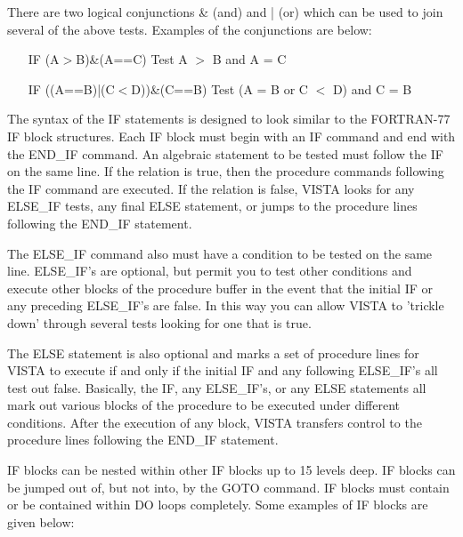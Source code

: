 There are two logical conjunctions \& (and) and | (or) which can be used to
join several of the above tests. Examples of the conjunctions are below:
\begin{itemize}
  \item[IF (A$>$B)\&(A==C)\hfill]{Test A $>$ B and A = C}
  \item[IF ((A==B)|(C$<$D))\&(C==B)\hfill]{Test (A = B or C $<$ D) and C = B}
\end{itemize}

The syntax of the IF statements is designed to look similar to the
FORTRAN-77 IF block structures.  Each IF block must begin with an IF
command and end with the END\_IF command.  An algebraic statement to be
tested must follow the IF on the same line.  If the relation is true, then
the procedure commands following the IF command are executed. If the
relation is false, VISTA looks for any ELSE\_IF tests, any final ELSE
statement, or jumps to the procedure lines following the END\_IF statement.

The ELSE\_IF command also must have a condition to be tested on the same
line.  ELSE\_IF's are optional, but permit you to test other conditions and
execute other blocks of the procedure buffer in the event that the initial
IF or any preceding ELSE\_IF's are false.  In this way you can allow VISTA
to 'trickle down' through several tests looking for one that is true.

The ELSE statement is also optional and marks a set of procedure lines for
VISTA to execute if and only if the initial IF and any following ELSE\_IF's
all test out false. Basically, the IF, any ELSE\_IF's, or any ELSE
statements all mark out various blocks of the procedure to be executed
under different conditions.  After the execution of any block, VISTA
transfers control to the procedure lines following the END\_IF statement.

IF blocks can be nested within other IF blocks up to 15 levels deep.  IF
blocks can be jumped out of, but not into, by the GOTO command. IF blocks
must contain or be contained within DO loops completely. Some examples of
IF blocks are given below:

